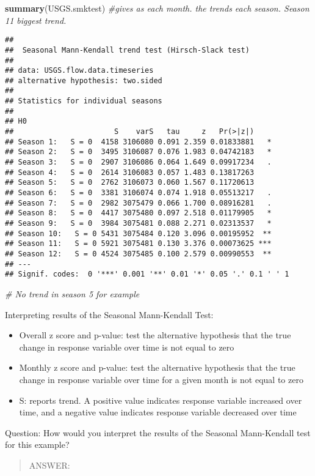 \documentclass[]{article}
\newenvironment{Shaded}{\begin{snugshade}}{\end{snugshade}}
\newcommand{\KeywordTok}[1]{\textcolor[rgb]{0.13,0.29,0.53}{\textbf{#1}}}
\newcommand{\CommentTok}[1]{\textcolor[rgb]{0.56,0.35,0.01}{\textit{#1}}}
\newcommand{\NormalTok}[1]{#1}
\begin{document}
\begin{Shaded}
\begin{Highlighting}[]
\KeywordTok{summary}\NormalTok{(USGS.smktest) }\CommentTok{#gives as each month. the trends each season. Season 11 biggest trend. }
\end{Highlighting}
\end{Shaded}

\begin{verbatim}
## 
##  Seasonal Mann-Kendall trend test (Hirsch-Slack test)
## 
## data: USGS.flow.data.timeseries
## alternative hypothesis: two.sided
## 
## Statistics for individual seasons
## 
## H0
##                       S    varS   tau     z   Pr(>|z|)    
## Season 1:   S = 0  4158 3106080 0.091 2.359 0.01833881   *
## Season 2:   S = 0  3495 3106087 0.076 1.983 0.04742183   *
## Season 3:   S = 0  2907 3106086 0.064 1.649 0.09917234   .
## Season 4:   S = 0  2614 3106083 0.057 1.483 0.13817263    
## Season 5:   S = 0  2762 3106073 0.060 1.567 0.11720613    
## Season 6:   S = 0  3381 3106074 0.074 1.918 0.05513217   .
## Season 7:   S = 0  2982 3075479 0.066 1.700 0.08916281   .
## Season 8:   S = 0  4417 3075480 0.097 2.518 0.01179905   *
## Season 9:   S = 0  3984 3075481 0.088 2.271 0.02313537   *
## Season 10:   S = 0 5431 3075484 0.120 3.096 0.00195952  **
## Season 11:   S = 0 5921 3075481 0.130 3.376 0.00073625 ***
## Season 12:   S = 0 4524 3075485 0.100 2.579 0.00990553  **
## ---
## Signif. codes:  0 '***' 0.001 '**' 0.01 '*' 0.05 '.' 0.1 ' ' 1
\end{verbatim}

\begin{Shaded}
\begin{Highlighting}[]
\CommentTok{# No trend in season 5 for example}
\end{Highlighting}
\end{Shaded}

Interpreting results of the Seasonal Mann-Kendall Test:

\begin{itemize}
\item
  Overall z score and p-value: test the alternative hypothesis that the
  true change in response variable over time is not equal to zero
\item
  Monthly z score and p-value: test the alternative hypothesis that the
  true change in response variable over time for a given month is not
  equal to zero
\item
  S: reports trend. A positive value indicates response variable
  increased over time, and a negative value indicates response variable
  decreased over time
\end{itemize}

Question: How would you interpret the results of the Seasonal
Mann-Kendall test for this example?

\begin{quote}
ANSWER:
\end{quote}
\end{document}
